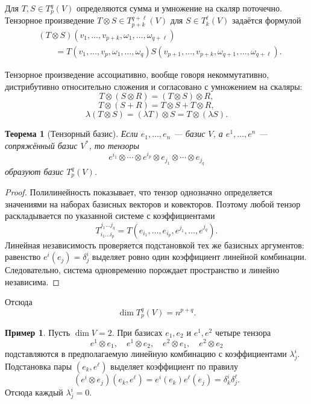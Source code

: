 \documentclass[12pt,a4paper,oneside,openany]{book}
\theoremstyle{definition}
\newtheorem{example}{Пример}[chapter]
\theoremstyle{plain}
\newtheorem{theorem}{Теорема}[chapter]
\theoremstyle{remark}
\begin{document}
Для $T,S\in T_p^q(V)$ определяются сумма и умножение на скаляр
поточечно. Тензорное произведение
$T\otimes S\in T_{p+k}^{q+\ell}(V)$ для
$S\in T_k^{\ell}(V)$ задаётся формулой
\[
\begin{aligned}
&(T\otimes S)(v_1,\ldots,v_{p+k},
\omega_1,\ldots,\omega_{q+\ell})\\
&\qquad=T(v_1,\ldots,v_p,\omega_1,\ldots,\omega_q)
S(v_{p+1},\ldots,v_{p+k},
\omega_{q+1},\ldots,\omega_{q+\ell}).
\end{aligned}
\]


Тензорное произведение ассоциативно, вообще говоря некоммутативно,
дистрибутивно относительно сложения и согласовано с умножением на скаляры:
\[
  T\otimes(S\otimes R)=(T\otimes S)\otimes R,
\]
\[
  T\otimes(S+R)=T\otimes S+T\otimes R,
\]
\[
  \lambda(T\otimes S)=(\lambda T)\otimes S=T\otimes(\lambda S).
\]

\begin{theorem}[Тензорный базис]
Если $e_1,\ldots,e_n$ --- базис $V$, а $e^1,\ldots,e^n$ --- сопряжённый
базис $V^*$, то тензоры
\[
  e^{i_1}\otimes\cdots\otimes e^{i_p}
  \otimes e_{j_1}\otimes\cdots\otimes e_{j_q}
\]
образуют базис $T_p^q(V)$.
\end{theorem}

\begin{proof}
Полилинейность показывает, что тензор однозначно определяется значениями
на наборах базисных векторов и ковекторов. Поэтому любой тензор
раскладывается по указанной системе с коэффициентами
\[
  T_{i_1\ldots i_p}^{j_1\ldots j_q}
  =T(e_{i_1},\ldots,e_{i_p},
      e^{j_1},\ldots,e^{j_q}).
\]
Линейная независимость проверяется подстановкой тех же базисных
аргументов: равенство $e^i(e_j)=\delta^i_j$ выделяет ровно один
коэффициент линейной комбинации. Следовательно, система одновременно
порождает пространство и линейно независима.
\end{proof}

Отсюда
\[
  \dim T_p^q(V)=n^{p+q}.
\]

\begin{example}
Пусть $\dim V=2$. При
базисах $e_1,e_2$ и $e^1,e^2$ четыре тензора
\[
  e^1\otimes e_1,\quad e^1\otimes e_2,\quad
  e^2\otimes e_1,\quad e^2\otimes e_2
\]
подставляются в предполагаемую линейную комбинацию с коэффициентами
$\lambda^i_j$. Подстановка пары $(e_k,e^\ell)$ выделяет коэффициент по
правилу
\[
  (e^i\otimes e_j)(e_k,e^\ell)
  =e^i(e_k)e^\ell(e_j)=\delta^i_k\delta^\ell_j.
\]
Отсюда каждый $\lambda^i_j=0$.
\end{example}
\end{document}
